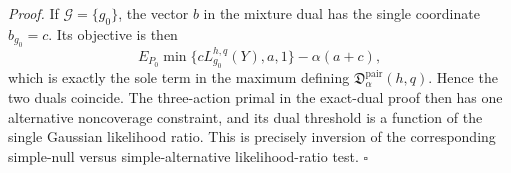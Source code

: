 \textit{Proof.}
If \(\mathcal G=\{g_0\}\), the vector \(b\) in the mixture dual has the single
coordinate \(b_{g_0}=c\).  Its objective is then
\[
E_{P_0}\min\{cL_{g_0}^{h,q}(Y),a,1\}-\alpha(a+c),
\]
which is exactly the sole term in the maximum defining
\(\mathfrak D_\alpha^{\mathrm{pair}}(h,q)\).  Hence the two duals coincide.
The three-action primal in the exact-dual proof then has one alternative
noncoverage constraint, and its dual threshold is a function of the single
Gaussian likelihood ratio.  This is precisely inversion of the corresponding
simple-null versus simple-alternative likelihood-ratio test. \(\square\)